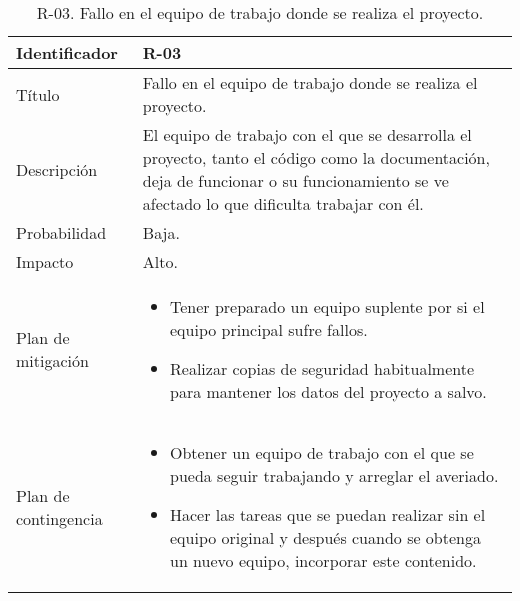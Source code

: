 \begin{table}[H]
  \centering
\begin{tabularx}{1\textwidth} { 
  | >{\centering\arraybackslash}X 
  | >{\centering\arraybackslash}X 
  |  }
 \hline
  Identificador & R-03 \\
 \hline
 Título & Fallo en el equipo de trabajo donde se realiza el proyecto. \\
 \hline
 Descripción  & El equipo de trabajo con el que se desarrolla el proyecto, tanto el código como la documentación, deja de funcionar o su funcionamiento se ve afectado lo que dificulta trabajar con él.  \\
\hline
 Probabilidad  & Baja.   \\
 \hline
 Impacto  & Alto.  \\
 \hline
 Plan de mitigación  & \begin{itemize}
     \item Tener preparado un equipo suplente por si el equipo principal sufre fallos. 
      \item Realizar copias de seguridad habitualmente para mantener los datos del proyecto a salvo.
 \end{itemize}   \\
 \hline
  Plan de contingencia  & \begin{itemize}
     \item Obtener un equipo de trabajo con el que se pueda seguir trabajando y arreglar el averiado.
     \item Hacer las tareas que se puedan realizar sin el equipo original y después cuando se obtenga un nuevo equipo, incorporar este contenido.

     
      
 \end{itemize}   \\
 

  \hline
\end{tabularx}
\caption{R-03. Fallo en el equipo de trabajo donde se realiza el proyecto.}
\label{table:R-03}
\end{table}





